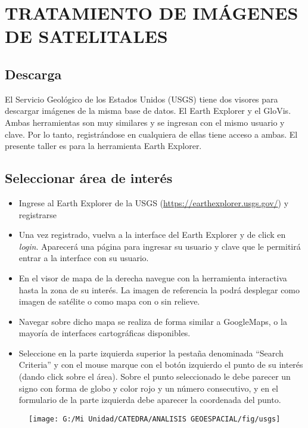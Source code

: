 \documentclass[a4paper,oneside,11pt,]{article}
\begin{document}
\section{TRATAMIENTO DE IMÁGENES DE SATELITALES}

\subsection{Descarga}

El Servicio Geológico de los Estados Unidos (USGS) tiene dos visores para descargar imágenes de la misma base de datos. El Earth Explorer y el GloVis. Ambas herramientas son muy similares y se ingresan con el mismo usuario y clave. Por lo tanto, registrándose en cualquiera de ellas tiene acceso a ambas. El presente taller es para la herramienta Earth Explorer.

\subsection{Seleccionar área de interés}

\begin{itemize}
\item Ingrese al Earth Explorer de la USGS (\url{https://earthexplorer.usgs.gov/}) y registrarse
\item Una vez registrado, vuelva a la interface del Earth Explorer y de click en \emph{login}. Aparecerá una página para ingresar su usuario y clave que le permitirá entrar a la interface con su usuario. 
\item En el visor de mapa de la derecha navegue con la herramienta interactiva hasta la zona de su interés. La imagen de referencia la podrá desplegar como imagen de satélite o como mapa con o sin relieve.
\item Navegar sobre dicho mapa se realiza de forma similar a GoogleMaps, o la mayoría de interfaces cartográficas disponibles. 
\item Seleccione en la parte izquierda superior la pestaña denominada “Search Criteria” y con el mouse marque con el botón izquierdo el punto de su interés (dando click sobre el área). Sobre el punto seleccionado le debe parecer  un signo con forma de globo y color rojo y un número consecutivo, y en el formulario de la parte izquierda debe aparecer la coordenada del punto.
\end{itemize}

\begin{figure}
\centering
\texttt{[image: G:/Mi Unidad/CATEDRA/ANALISIS GEOESPACIAL/fig/usgs]}
\end{figure}
\end{document}
